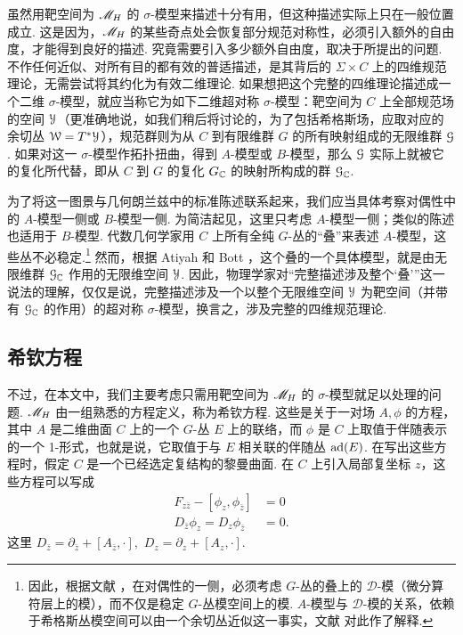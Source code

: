 虽然用靶空间为 ${{\mathscr{M}}_H}$ 的 $\sigma$-模型来描述十分有用，但这种描述实际上只在一般位置成立. 这是因为，${{\mathscr{M}}_H}$ 的某些奇点处会恢复部分规范对称性，必须引入额外的自由度，才能得到良好的描述. 究竟需要引入多少额外自由度，取决于所提出的问题. 不作任何近似、对所有目的都有效的普适描述，是其背后的 $\Sigma\times C$ 上的四维规范理论，无需尝试将其约化为有效二维理论. 如果想把这个完整的四维理论描述成一个二维 $\sigma$-模型，就应当称它为如下二维超对称 $\sigma$-模型：靶空间为 $C$ 上全部规范场的空间 ${\mathcal Y}$（更准确地说，如我们稍后将讨论的，为了包括希格斯场，应取对应的余切丛 ${\mathcal W}=T^*{\mathcal Y}$），规范群则为从 $C$ 到有限维群 $G$ 的所有映射组成的无限维群 ${\mathcal G}$. 如果对这一 $\sigma$-模型作拓扑扭曲，得到 $A$-模型或 $B$-模型，那么 ${\mathcal G}$ 实际上就被它的复化所代替，即从 $C$ 到 $G$ 的复化 $G_{\mathbb C}$ 的映射所构成的群 ${\mathcal G}_{\mathbb C}$.

为了将这一图景与几何朗兰兹中的标准陈述联系起来，我们应当具体考察对偶性中的 $A$-模型一侧或 $B$-模型一侧. 为简洁起见，这里只考虑 $A$-模型一侧；类似的陈述也适用于 $B$-模型. 代数几何学家用 $C$ 上所有全纯 $G$-丛的“叠”来表述 $A$-模型，这些丛不必稳定.\footnote{因此，根据文献 \cite{BeD}，在对偶性的一侧，必须考虑 $G$-丛的叠上的 $\mathcal D$-模（微分算符层上的模），而不仅是稳定 $G$-丛模空间上的模. $A$-模型与 $\mathcal D$-模的关系，依赖于希格斯丛模空间可以由一个余切丛近似这一事实，文献 \cite{KW} 对此作了解释.} 然而，根据 Atiyah 和 Bott \cite{AB}，这个叠的一个具体模型，就是由无限维群 ${\mathcal G}_{\mathbb C}$ 作用的无限维空间 ${\mathcal Y}$. 因此，物理学家对“完整描述涉及整个‘叠’”这一说法的理解，仅仅是说，完整描述涉及一个以整个无限维空间 ${\mathcal Y}$ 为靶空间（并带有 ${\mathcal G}_{\mathbb C}$ 的作用）的超对称 $\sigma$-模型，换言之，涉及完整的四维规范理论.

\subsection{希钦方程}\label{hitcheq}

不过，在本文中，我们主要考虑只需用靶空间为 ${{\mathscr{M}}_H}$ 的 $\sigma$-模型就足以处理的问题. ${{\mathscr{M}}_H}$ 由一组熟悉的方程定义，称为希钦方程. 这些是关于一对场 $A,\phi$ 的方程，其中 $A$ 是二维曲面 $C$ 上的一个 $G$-丛 $E$ 上的联络，而 $\phi$ 是 $C$ 上取值于伴随表示的一个 1-形式，也就是说，它取值于与 $E$ 相关联的伴随丛 ${\mathrm{ad}(E)}$. 在写出这些方程时，假定 $C$ 是一个已经选定复结构的黎曼曲面. 在 $C$ 上引入局部复坐标 $z$，这些方程可以写成
\begin{align}
\label{secondway} F_{z\bar z}-[\phi_z,\phi_{\bar z}]&=0\nonumber
\\    D_{\bar z}\phi_z=D_z\phi_{\bar z}&=0. \end{align}
这里 $D_{\bar z}=\partial_{\bar z}+[A_{\bar z},\cdot],$ $D_z=\partial_z+[A_z,\cdot]$.

